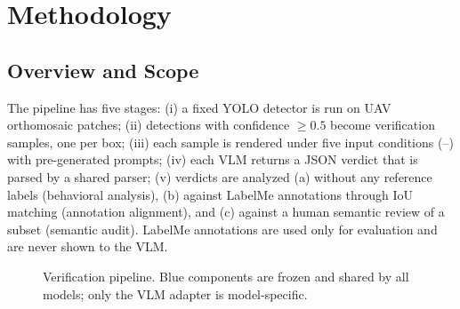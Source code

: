 \section{Methodology}
\label{sec:method}

\subsection{Overview and Scope}
\label{sec:method:overview}
The pipeline has five stages: (i) a fixed YOLO detector is run on UAV
orthomosaic patches; (ii) detections with confidence $\geq 0.5$ become
verification samples, one per box; (iii) each sample is rendered under five
input conditions (--) with pre-generated prompts; (iv) each
VLM returns a JSON verdict that is parsed by a shared parser; (v) verdicts are
analyzed (a) without any reference labels (behavioral analysis), (b) against
LabelMe annotations through IoU matching (annotation alignment), and (c) against
a human semantic review of a subset (semantic audit). LabelMe annotations are
used only for evaluation and are never shown to the VLM.

\begin{figure}[t]
  \centering
  \caption{Verification pipeline. Blue components are frozen and shared by all models; only the VLM adapter is model-specific.}
  \label{fig:pipeline}
\end{figure}

